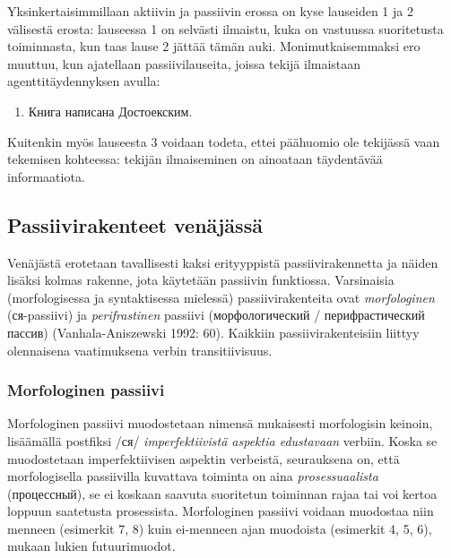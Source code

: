 \documentclass[]{scrartcl}
\providecommand{\tightlist}{%
  \setlength{\itemsep}{0pt}\setlength{\parskip}{0pt}}
\begin{document}
Yksinkertaisimmillaan aktiivin ja passiivin erossa on kyse lauseiden 1
ja 2 välisestä erosta: lauseessa 1 on selvästi ilmaistu, kuka on
vastuussa suoritetusta toiminnasta, kun taas lause 2 jättää tämän auki.
Monimutkaisemmaksi ero muuttuu, kun ajatellaan passiivilauseita, joissa
tekijä ilmaistaan agenttitäydennyksen avulla:

\begin{enumerate}
\def\labelenumi{(\arabic{enumi})}
\setcounter{enumi}{2}
\tightlist
\item
  Книга написана Достоекским.
\end{enumerate}

Kuitenkin myös lauseesta 3 voidaan todeta, ettei päähuomio ole tekijässä
vaan tekemisen kohteessa: tekijän ilmaiseminen on ainoataan täydentävää
informaatiota.

\subsection{Passiivirakenteet
venäjässä}\label{passiivirakenteet-venuxe4juxe4ssuxe4}

Venäjästä erotetaan tavallisesti kaksi erityyppistä passiivirakennetta
ja näiden lisäksi kolmas rakenne, jota käytetään passiivin funktiossa.
Varsinaisia (morfologisessa ja syntaktisessa mielessä)
passiivirakenteita ovat \emph{morfologinen} (ся-passiivi) ja
\emph{perifrastinen} passiivi (морфологический / перифрастический
пассив) (Vanhala-Aniszewski 1992: 60). Kaikkiin passiivirakenteisiin
liittyy olennaisena vaatimuksena verbin transitiivisuus.

\subsubsection{Morfologinen passiivi}\label{morfologinen-passiivi}

Morfologinen passiivi muodostetaan nimensä mukaisesti morfologisin
keinoin, lisäämällä postfiksi /ся/ \emph{imperfektiivistä aspektia
edustavaan} verbiin. Koska se muodostetaan imperfektiivisen aspektin
verbeistä, seurauksena on, että morfologisella passiivilla kuvattava
toiminta on aina \emph{prosessuaalista} (процессный), se ei koskaan
saavuta suoritetun toiminnan rajaa tai voi kertoa loppuun saatetusta
prosessista. Morfologinen passiivi voidaan muodostaa niin menneen
(esimerkit 7, 8) kuin ei-menneen ajan muodoista (esimerkit 4, 5, 6),
mukaan lukien futuurimuodot.
\end{document}
